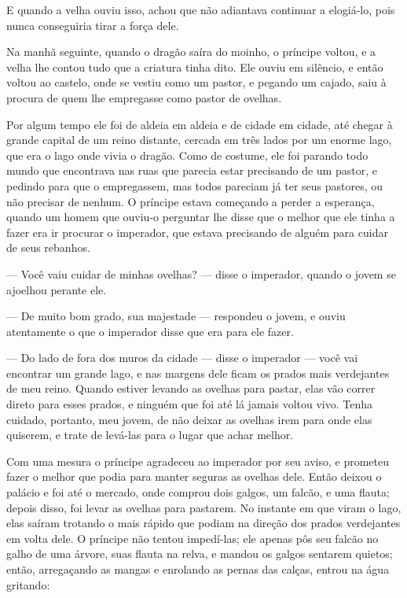 E quando a velha ouviu isso, achou que não adiantava continuar a
elogiá-lo, pois nunca conseguiria tirar a força dele.

Na manhã seguinte, quando o dragão saíra do moinho, o príncipe voltou,
e a velha lhe contou tudo que a criatura tinha dito. Ele ouviu em
silêncio, e então voltou ao castelo, onde se vestiu como um pastor, e
pegando um cajado, saiu à procura de quem lhe empregasse como pastor
de ovelhas. 

Por algum tempo ele foi de aldeia em aldeia e de cidade em cidade, até
chegar à grande capital de um reino distante, cercada em três lados
por um enorme lago, que era o lago onde vivia o dragão. Como de
costume, ele foi parando todo mundo que encontrava nas ruas que
parecia estar precisando de um pastor, e pedindo para que o
empregassem, mas todos pareciam já ter seus pastores, ou não precisar
de nenhum. O príncipe estava começando a perder a esperança, quando
um homem que ouviu-o perguntar lhe disse que o melhor que ele tinha a
fazer era ir procurar o imperador, que estava precisando de alguém
para cuidar de seus rebanhos. 

— Você vaiu cuidar de minhas ovelhas? — disse o imperador, quando o
jovem se ajoelhou perante ele.

— De muito bom grado, sua majestade — respondeu o jovem, e ouviu
atentamente o que o imperador disse que era para ele fazer.

— Do lado de fora dos muros da cidade — disse o imperador — você vai
encontrar um grande lago, e nas margens dele ficam os prados mais
verdejantes de meu reino. Quando estiver levando as ovelhas para
pastar, elas vão correr direto para esses prados, e ninguém que foi
até lá jamais voltou vivo. Tenha cuidado, portanto, meu jovem, de não
deixar as ovelhas irem para onde elas quiserem, e trate de levá-las
para o lugar que achar melhor.

Com uma mesura o príncipe agradeceu ao imperador por seu aviso, e
prometeu fazer o melhor que podia para manter seguras as ovelhas
dele. Então deixou o palácio e foi até o mercado, onde comprou dois
galgos, um falcão, e uma flauta; depois disso, foi levar as ovelhas
para pastarem. No instante em que viram o lago, elas saíram trotando
o mais rápido que podiam na direção dos prados verdejantes em volta
dele. O príncipe não tentou impedí-las; ele apenas pôs seu falcão no
galho de uma árvore, suas flauta na relva, e mandou os galgos
sentarem quietos; então, arregaçando as mangas e enrolando as pernas
das calças, entrou na água gritando:

